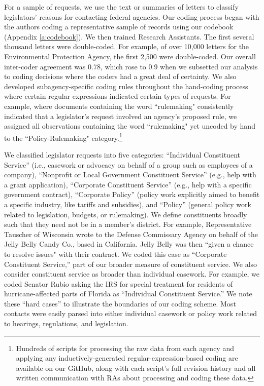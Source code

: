 \documentclass[12pt]{article}
\begin{document}
For a sample of  requests, we use the text or summaries of letters to classify legislators' reasons for contacting federal agencies. Our coding process began with the authors coding a representative sample of records using our codebook (Appendix \ref{a:codebook}). We then trained Research Assistants. The first several thousand letters were double-coded. For example, of over 10,000 letters for the Environmental Protection Agency, the first 2,500 were double-coded. Our overall inter-coder agreement was 0.78, which rose to 0.9 when we subsetted our analysis to coding decisions where the coders had a great deal of certainty. We also developed subagency-specific coding rules throughout the hand-coding process where certain regular expressions indicated certain types of requests. For example, where documents containing the word ``rulemaking" consistently indicated that a legislator's request involved an agency's proposed rule, we assigned all observations containing the word ``rulemaking" yet uncoded by hand to the ``Policy-Rulemaking" category.\footnote{Hundreds of scripts for processing the raw data from each agency and applying any inductively-generated regular-expression-based coding are available on our GitHub, along with each script's full revision history and all written communication with RAs about processing and coding these data.}

We classified legislator requests into five categories: ``Individual Constituent Service'' (i.e., casework or advocacy on behalf of a group such as employees of a company), ``Nonprofit or Local Government Constituent Service'' (e.g., help with a grant application), ``Corporate Constituent Service'' (e.g., help with a specific government contract), ``Corporate Policy'' (policy work explicitly aimed to benefit a specific industry, like tariffs and subsidies), and ``Policy'' (general policy work related to legislation, budgets, or rulemaking). We define constituents broadly such that they need not be in a member's district. For example, Representative Tauscher of Wisconsin wrote to the Defense Commissary Agency on behalf of the Jelly Belly Candy Co., based in California. Jelly Belly was then ``given a chance to resolve issues" with their contract. We coded this case as ``Corporate Constituent Service,'' part of our broader measure of constituent service. We also consider constituent service as broader than individual casework. For example, we coded Senator Rubio asking the IRS for special treatment for residents of hurricane-affected parts of Florida as ``Individual Constituent Service.'' We note these ``hard cases'' to illustrate the boundaries of our coding scheme. Most contacts were easily parsed into either individual casework or policy work related to hearings, regulations, and legislation.
\end{document}
